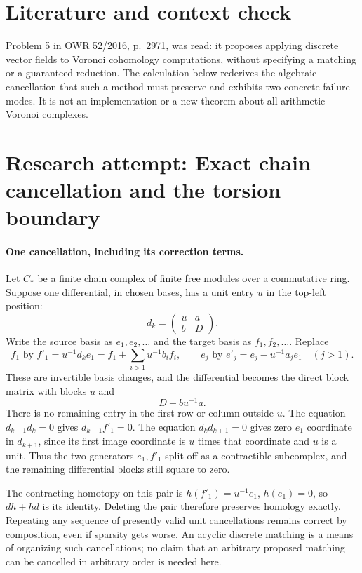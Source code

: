 \documentclass[11pt]{article}
\begin{document}
\section{Literature and context check}
Problem 5 in OWR 52/2016, p.~2971, was read: it proposes applying discrete vector fields to Voronoi cohomology computations, without specifying a matching or a guaranteed reduction. The calculation below rederives the algebraic cancellation that such a method must preserve and exhibits two concrete failure modes. It is not an implementation or a new theorem about all arithmetic Voronoi complexes.
\section{Research attempt: Exact chain cancellation and the torsion boundary}

\paragraph{One cancellation, including its correction terms.}
Let $C_*$ be a finite chain complex of finite free modules over a commutative ring. Suppose one differential, in chosen bases, has a unit entry $u$ in the top-left position:
\[
 d_k=\begin{pmatrix}u&a\\b&D\end{pmatrix}.
\]
Write the source basis as $e_1,e_2,\ldots$ and the target basis as $f_1,f_2,\ldots$. Replace
\[
 f_1\text{ by }f'_1=u^{-1}d_ke_1
       =f_1+\sum_{i>1}u^{-1}b_i f_i,
 \qquad
 e_j\text{ by }e'_j=e_j-u^{-1}a_j e_1\quad(j>1).
\]
These are invertible basis changes, and the differential becomes the direct block matrix with blocks $u$ and
\[
 D-bu^{-1}a.
\]
There is no remaining entry in the first row or column outside $u$. The equation $d_{k-1}d_k=0$ gives $d_{k-1}f'_1=0$. The equation $d_kd_{k+1}=0$ gives zero $e_1$ coordinate in $d_{k+1}$, since its first image coordinate is $u$ times that coordinate and $u$ is a unit. Thus the two generators $e_1,f'_1$ split off as a contractible subcomplex, and the remaining differential blocks still square to zero.

The contracting homotopy on this pair is $h(f'_1)=u^{-1}e_1$, $h(e_1)=0$, so $dh+hd$ is its identity. Deleting the pair therefore preserves homology exactly. Repeating any sequence of presently valid unit cancellations remains correct by composition, even if sparsity gets worse. An acyclic discrete matching is a means of organizing such cancellations; no claim that an arbitrary proposed matching can be cancelled in arbitrary order is needed here.
\end{document}

